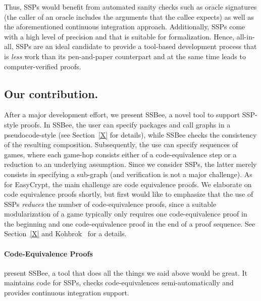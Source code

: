 Thus, SSPs would benefit from automated sanity checks such as oracle signatures
(the caller of an oracle includes the arguments that the callee expects) as
well as the aforementioned continuous integration approach.
Additionally, SSPs come with a high level of precision and
that is suitable for formalization. Hence, all-in-all, SSPs are an ideal
candidate to provide a tool-based development process
that is \emph{less} work than its pen-and-paper counterpart
and at the same time leads to computer-verified proofs.


\subsection{Our contribution.} After a major development effort,
we present SSBee, a novel tool to support SSP-style proofs. 
In SSBee, the user can specify packages and call graphs in a 
pseudocode-style (see Section~\ref{X} for details), while SSBee
checks the consistency of the resulting composition. Subsequently,
the use can specify sequences of games, where each game-hop consists
either of a code-equivalence step or a reduction to an underlying
assumption. Since we consider SSPs, the latter merely consists in
specifying a sub-graph (and verification is not a major challenge).
As for EasyCrypt, the main challenge are code equivalence proofs.
We elaborate on code equivalence proofs shortly, but first would
like to emphasize that the use of SSPs \emph{reduces} the number
of code-equivalence proofs, since a suitable modularization of a game
typically only requires one code-equivalence proof in the beginning
and one code-equivalence proof in the end of a proof sequence.
See Section~\ref{X} and Kohbrok~\cite{Kohbrok:thesis} for a details.

\paragraph{Code-Equivalence Proofs}






present SSBee, a tool that does all the things
we said above would be great. It maintains code for SSPs, checks code-equivalences
semi-automatically and provides continuous integration support.

